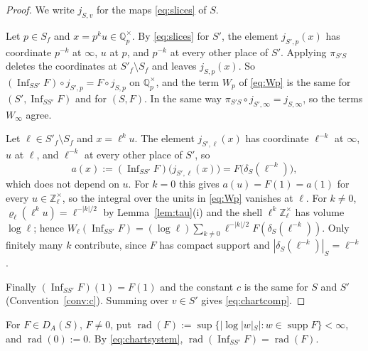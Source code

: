 \documentclass[11pt]{amsart}
\theoremstyle{definition}
\theoremstyle{remark}
\newcommand{\Z}{\mathbb Z}
\newcommand{\Q}{\mathbb Q}
\newcommand{\supp}{\operatorname{supp}}
\newcommand{\Inf}{\operatorname{Inf}}
\newcommand{\DA}{D_A}
\begin{document}
\begin{proof}
We write $j_{S,v}$ for the maps \eqref{eq:slices} of $S$.

Let $p\in S_f$ and $x=p^{k}u\in\Q_p^{\times}$.  By \eqref{eq:slices} for $S'$,
the element $j_{S',p}(x)$ has coordinate $p^{-k}$ at $\infty$, $u$ at $p$, and
$p^{-k}$ at every other place of $S'$.  Applying $\pi_{S'S}$ deletes the
coordinates at $S'_f\setminus S_f$ and leaves $j_{S,p}(x)$.  So
$(\Inf_{SS'}F)\circ j_{S',p}=F\circ j_{S,p}$ on $\Q_p^{\times}$, and the term
$W_p$ of \eqref{eq:Wp} is the same for $(S',\Inf_{SS'}F)$ and for $(S,F)$.
In the same way $\pi_{S'S}\circ j_{S',\infty}=j_{S,\infty}$, so the terms
$W_{\infty}$ agree.

Let $\ell\in S'_f\setminus S_f$ and $x=\ell^{k}u$.  The element $j_{S',\ell}(x)$
has coordinate $\ell^{-k}$ at $\infty$, $u$ at $\ell$, and $\ell^{-k}$ at every
other place of $S'$, so
\[
a(x):=(\Inf_{SS'}F)\bigl(j_{S',\ell}(x)\bigr)=F\bigl(\delta_S(\ell^{-k})\bigr),
\]
which does not depend on $u$.  For $k=0$ this gives $a(u)=F(1)=a(1)$ for every
$u\in\Z_{\ell}^{\times}$, so the integral over the units in \eqref{eq:Wp}
vanishes at $\ell$.  For $k\ne0$, $\varrho_{\ell}(\ell^{k}u)=\ell^{-|k|/2}$ by
Lemma~\ref{lem:tau}(i) and the shell $\ell^{k}\Z_{\ell}^{\times}$ has volume
$\log\ell$; hence
$W_{\ell}(\Inf_{SS'}F)=(\log\ell)\sum_{k\ne0}\ell^{-|k|/2}F(\delta_S(\ell^{-k}))$.
Only finitely many $k$ contribute, since $F$ has compact support and
$|\delta_S(\ell^{-k})|_S=\ell^{-k}$.

Finally $(\Inf_{SS'}F)(1)=F(1)$ and the constant $c$ is the same for $S$ and
$S'$ (Convention~\ref{conv:c}).  Summing over $v\in S'$ gives
\eqref{eq:chartcomp}.
\end{proof}

For $F\in\DA(S)$, $F\ne0$, put
$\operatorname{rad}(F):=\sup\{|\log|w|_S|:w\in\supp F\}<\infty$, and
$\operatorname{rad}(0):=0$.  By \eqref{eq:chartsystem},
$\operatorname{rad}(\Inf_{SS'}F)=\operatorname{rad}(F)$.
\end{document}
